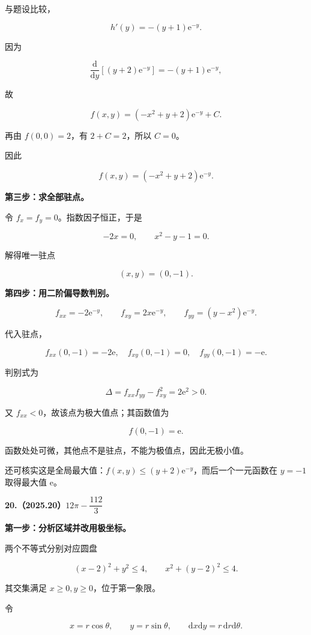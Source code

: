 \documentclass[UTF8,11pt,fontset=windows]{ctexart}
\begin{document}
与题设比较，

$$
h'(y)=-(y+1)\mathrm e^{-y}.
$$

因为

$$
\frac{\mathrm d}{\mathrm dy}[(y+2)\mathrm e^{-y}]
=-(y+1)\mathrm e^{-y},
$$

故

$$
f(x,y)=(-x^2+y+2)\mathrm e^{-y}+C.
$$

再由 $f(0,0)=2$，有 $2+C=2$，所以 $C=0$。

因此

$$
\boxed{f(x,y)=(-x^2+y+2)\mathrm e^{-y}}.
$$

\textbf{第三步：求全部驻点。}

令 $f_x=f_y=0$。指数因子恒正，于是

$$
-2x=0,\qquad x^2-y-1=0.
$$

解得唯一驻点

$$
(x,y)=(0,-1).
$$

\textbf{第四步：用二阶偏导数判别。}

$$
f_{xx}=-2\mathrm e^{-y},\qquad
f_{xy}=2x\mathrm e^{-y},\qquad
f_{yy}=(y-x^2)\mathrm e^{-y}.
$$

代入驻点，

$$
f_{xx}(0,-1)=-2\mathrm e,
\quad f_{xy}(0,-1)=0,
\quad f_{yy}(0,-1)=-\mathrm e.
$$

判别式为

$$
\Delta=f_{xx}f_{yy}-f_{xy}^2=2\mathrm e^2>0.
$$

又 $f_{xx}<0$，故该点为极大值点；其函数值为

$$
\boxed{f(0,-1)=\mathrm e}.
$$

函数处处可微，其他点不是驻点，不能为极值点，因此无极小值。

还可核实这是全局最大值：$f(x,y)\le(y+2)\mathrm e^{-y}$，而后一个一元函数在 $y=-1$ 取得最大值 $\mathrm e$。

\clearpage

\textbf{20.（2025.20）$12\pi-\dfrac{112}{3}$}

\textbf{第一步：分析区域并改用极坐标。}

两个不等式分别对应圆盘

$$
(x-2)^2+y^2\le4,\qquad x^2+(y-2)^2\le4.
$$

其交集满足 $x\ge0,y\ge0$，位于第一象限。

令

$$
x=r\cos\theta,\qquad y=r\sin\theta,
\qquad \mathrm dx\mathrm dy=r\,\mathrm dr\mathrm d\theta.
$$
\end{document}
